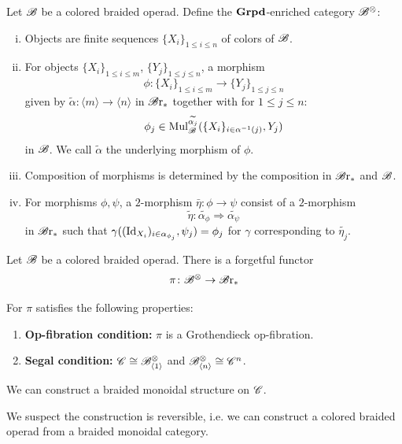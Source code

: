 \begin{frame}
    \small{\begin{defin} Let $\mathscr{B}$ be a colored braided operad. Define the
    $\operatorname{\textbf{Grpd}}$-enriched category $\mathscr{B}^{\otimes}$:
    \begin{enumerate}[(i)]
        \item Objects are finite sequences $\{X_i\}_{1 \leq i \leq n}$ of colors
        of $\mathscr{B}$.
        \item For objects $\{X_i\}_{1 \leq i \leq m}$, $\{Y_j\}_{1 \leq j \leq
        n}$, a morphism 
        \[
            \phi \colon \{X_i\}_{1 \leq i \leq m} \to \{Y_j\}_{1 \leq j \leq n}
        \]
        given by $\widetilde{\alpha} \colon \langle m \rangle \to \langle n
        \rangle$ in $\mathscr{B} \text{r}_{\ast}$ together with for $1 \leq j \leq n$:
        \[
            \phi_j \in \operatorname{Mul}_{\mathscr{B}}^{\widetilde{\alpha_j}}(\{X_i\}_{i \in \alpha^{-1}(j)}, Y_j)
        \]
        in $\mathscr{B}$. We call $\widetilde{\alpha}$ the underlying morphism of $\phi$.
        \item Composition of morphisms is determined by the composition in
        $\mathscr{B} \text{r}_{\ast}$ and $\mathscr{B}$.
        \item For morphisms $\phi, \psi$, a $2$-morphism $\bar{\eta} \colon \phi
        \to \psi$ consist of a $2$-morphism 
        $$\widetilde{\eta} \colon \widetilde{\alpha_{\phi}} \Rightarrow
        \widetilde{\alpha_{\psi}}$$ in $\mathscr{B} \text{r}_{\ast}$ such that $\gamma((\operatorname{Id}_{X_i})_{i
        \in \alpha_{\phi_j}}, \psi_j) = \phi_j$ for $\gamma$ corresponding to
        $\widetilde{\eta_j}$.
    \end{enumerate}
\end{defin}}
\end{frame}

\begin{frame}
Let $\mathscr{B}$ be a colored braided operad. There is a forgetful functor 
\[
\pi \colon \mathscr{B}^{\otimes} \to \mathscr{B} \text{r}_{\ast}
\]
\pause
\begin{thm}
For $\pi$ satisfies the following properties:
    \begin{enumerate}[(M1)]
        \item \textbf{Op-fibration condition:} $\pi$ is a Grothendieck
        op-fibration. 
        \item \textbf{Segal condition:} $\mathscr{C} \cong \mathscr{B}^{\otimes}_{\langle 1 \rangle}$ and
        $\mathscr{B}^{\otimes}_{\langle n \rangle} \cong \mathscr{C}^n$.
    \end{enumerate}
We can construct a braided monoidal structure on $\mathscr{C}$.
\end{thm}

We suspect the construction is reversible, i.e. we can construct a colored braided operad from a braided monoidal category.
\end{frame}


